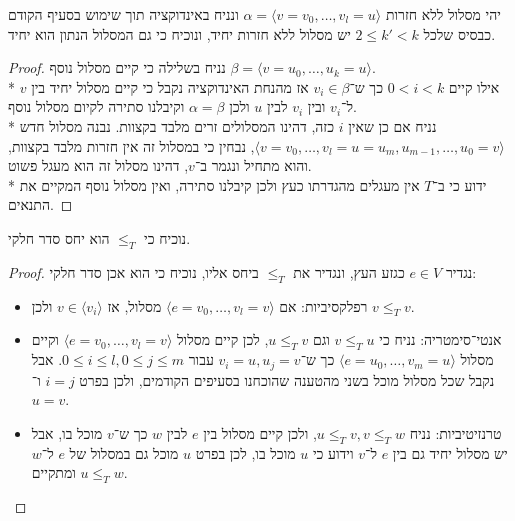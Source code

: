 \Subquestion{}
יהי מסלול ללא חזרות $\alpha = \langle v = v_0, \dots, v_l = u \rangle$ ונניח באינדוקציה תוך שימוש בסעיף הקודם כבסיס שלכל $2 \le k' < k$ יש מסלול ללא חזרות יחיד, ונוכיח כי גם המסלול הנתון הוא יחיד.
\begin{proof}
	נניח בשלילה כי קיים מסלול נוסף $\beta = \langle v = u_0, \dots, u_k = u \rangle$. \\*
	אילו קיים $0 < i < k$ כך ש־$v_i \in \beta$ אז מהנחת האינדוקציה נקבל כי קיים מסלול יחיד בין $v$ ל־$v_i$ ובין $v_i$ לבין $u$ ולכן $\alpha = \beta$ וקיבלנו סתירה לקיום מסלול נוסף. \\*
	נניח אם כן שאין $i$ כזה, דהינו המסלולים זרים מלבד בקצוות.
	נבנה מסלול חדש $\langle v = v_0, \dots, v_l = u = u_m, u_{m - 1}, \dots, u_0 = v \rangle$, נבחין כי במסלול זה אין חזרות מלבד בקצוות, והוא מתחיל ונגמר ב־$v$, דהינו מסלול זה הוא מעגל פשוט. \\*
	ידוע כי ב־$T$ אין מעגלים מהגדרתו כעץ ולכן קיבלנו סתירה, ואין מסלול נוסף המקיים את התנאים.
\end{proof}

\Subquestion{}
נוכיח כי $\le_T$ הוא יחס סדר חלקי.
\begin{proof}
	נגדיר $e \in V$ כגזע העץ, ונגדיר את $\le_T$ ביחס אליו, נוכיח כי הוא אכן סדר חלקי:
	\begin{itemize}
		\item רפלקסיביות: אם $\langle e = v_0, \dots, v_l = v \rangle$ מסלול, אז $v \in \langle v_i \rangle$ ולכן $v \le_T v$.
		\item אנטי־סימטריה: נניח כי $v \le_T u$ וגם $u \le_T v$,
			לכן קיים מסלול $\langle e = v_0, \dots, v_l = v \rangle$ וקיים מסלול $\langle e = u_0, \dots, v_m = u \rangle$ כך ש־$v_i = u, u_j = v$ עבור $0 \le i \le l, 0 \le j \le m$.
			אבל נקבל שכל מסלול מוכל בשני מהטענה שהוכחנו בסעיפים הקודמים, ולכן בפרט $i = j$ ו־$u = v$.
		\item טרנזיטיביות: נניח $u \le_T v, v \le_T w$, ולכן קיים מסלול בין $e$ לבין $w$ כך ש־$v$ מוכל בו, אבל יש מסלול יחיד גם בין $e$ ל־$v$ וידוע כי $u$ מוכל בו, לכן בפרט $u$ מוכל גם במסלול של $e$ ל־$w$ ומתקיים $u \le_T w$.
	\end{itemize}
\end{proof}

\Question{}



